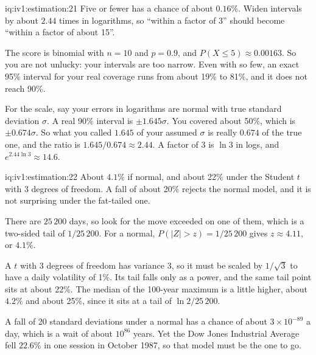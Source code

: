 \begin{solution}{iq:iv1:estimation:21}
Five or fewer has a chance of about $0.16\%$. Widen intervals by about $2.44$ times in logarithms, so ``within a factor of 3'' should become ``within a factor of about 15''.

The score is binomial with $n = 10$ and $p = 0.9$, and $P(X \le 5) \approx 0.00163$. So you are not unlucky: your intervals are too narrow. Even with so few, an exact 95\% interval for your real coverage runs from about 19\% to 81\%, and it does not reach 90\%.

For the scale, say your errors in logarithms are normal with true standard deviation $\sigma$. A real 90\% interval is $\pm 1.645\sigma$. You covered about 50\%, which is $\pm 0.674\sigma$. So what you called $1.645$ of your assumed $\sigma$ is really $0.674$ of the true one, and the ratio is $1.645/0.674 \approx 2.44$. A factor of 3 is $\ln 3$ in logs, and $e^{2.44 \ln 3} \approx 14.6$.

\end{solution}

\begin{solution}{iq:iv1:estimation:22}
About $4.1\%$ if normal, and about 22\% under the Student $t$ with 3 degrees of freedom. A fall of about 20\% rejects the normal model, and it is not surprising under the fat-tailed one.

There are $25\,200$ days, so look for the move exceeded on one of them, which is a two-sided tail of $1/25\,200$. For a normal, $P(|Z| > z) = 1/25\,200$ gives $z \approx 4.11$, or $4.1\%$.

A $t$ with 3 degrees of freedom has variance 3, so it must be scaled by $1/\sqrt{3}$ to have a daily volatility of 1\%. Its tail falls only as a power, and the same tail point sits at about 22\%. The median of the 100-year maximum is a little higher, about $4.2\%$ and about 25\%, since it sits at a tail of $\ln 2/25\,200$.

A fall of 20 standard deviations under a normal has a chance of about $3 \times 10^{-89}$ a day, which is a wait of about $10^{86}$ years. Yet the Dow Jones Industrial Average fell $22.6\%$ in one session in October 1987, so that model must be the one to go.

\end{solution}

